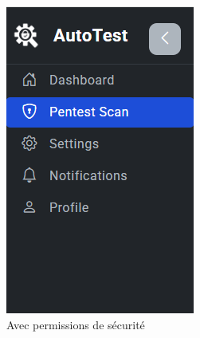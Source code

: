 \begin{justify}
\begin{enumerate}[label=\Alph*.]
\begin{figure}[H]
\begin{subfigure}[b]{0.32\linewidth}
                        \includegraphics[width=0.9\linewidth]{chapitres/ch3Sp1/section/sprint1/img/interface/1-permssion.PNG}
                        \caption{Avec permissions de sécurité}
                    \end{subfigure}
                    \hfill
                    \begin{subfigure}[b]{0.32\linewidth}
                        \centering

\end{subfigure}
\end{figure}
\end{enumerate}
\end{justify}
